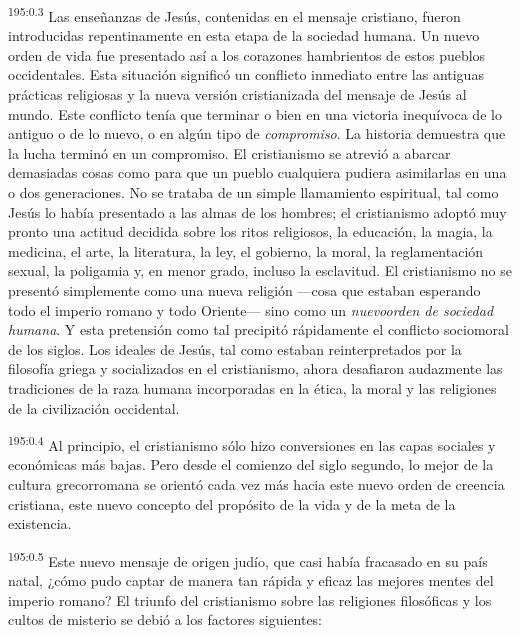 \par 
\textsuperscript{195:0.3} Las enseñanzas de Jesús, contenidas en el mensaje cristiano, fueron introducidas repentinamente en esta etapa de la sociedad humana. Un nuevo orden de vida fue presentado así a los corazones hambrientos de estos pueblos occidentales. Esta situación significó un conflicto inmediato entre las antiguas prácticas religiosas y la nueva versión cristianizada del mensaje de Jesús al mundo. Este conflicto tenía que terminar o bien en una victoria inequívoca de lo antiguo o de lo nuevo, o en algún tipo de \textit{compromiso}. La historia demuestra que la lucha terminó en un compromiso. El cristianismo se atrevió a abarcar demasiadas cosas como para que un pueblo cualquiera pudiera asimilarlas en una o dos generaciones. No se trataba de un simple llamamiento espiritual, tal como Jesús lo había presentado a las almas de los hombres; el cristianismo adoptó muy pronto una actitud decidida sobre los ritos religiosos, la educación, la magia, la medicina, el arte, la literatura, la ley, el gobierno, la moral, la reglamentación sexual, la poligamia y, en menor grado, incluso la esclavitud. El cristianismo no se presentó simplemente como una nueva religión ---cosa que estaban esperando todo el imperio romano y todo Oriente--- sino como un \textit{nuevoorden de sociedad humana}. Y esta pretensión como tal precipitó rápidamente el conflicto sociomoral de los siglos. Los ideales de Jesús, tal como estaban reinterpretados por la filosofía griega y socializados en el cristianismo, ahora desafiaron audazmente las tradiciones de la raza humana incorporadas en la ética, la moral y las religiones de la civilización occidental.

\par 
\textsuperscript{195:0.4} Al principio, el cristianismo sólo hizo conversiones en las capas sociales y económicas más bajas. Pero desde el comienzo del siglo segundo, lo mejor de la cultura grecorromana se orientó cada vez más hacia este nuevo orden de creencia cristiana, este nuevo concepto del propósito de la vida y de la meta de la existencia.

\par 
\textsuperscript{195:0.5} Este nuevo mensaje de origen judío, que casi había fracasado en su país natal, ¿cómo pudo captar de manera tan rápida y eficaz las mejores mentes del imperio romano? El triunfo del cristianismo sobre las religiones filosóficas y los cultos de misterio se debió a los factores siguientes:

